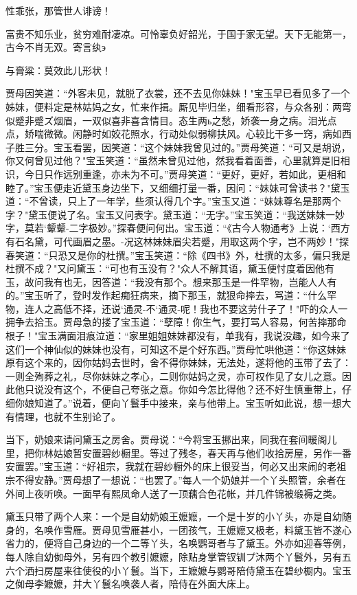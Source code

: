 性乖张，那管世人诽谤！

富贵不知乐业，贫穷难耐凄凉。可怜辜负好韶光，于国于家无望。天下无能第一，古今不肖无双。寄言纨э

与膏粱：莫效此儿形状！

贾母因笑道：“外客未见，就脱了衣裳，还不去见你妹妹！"宝玉早已看见多了一个姊妹，便料定是林姑妈之女，忙来作揖。厮见毕归坐，细看形容，与众各别：两弯似蹙非蹙ズ烟眉，一双似喜非喜含情目。态生两ь之愁，娇袭一身之病。泪光点点，娇喘微微。闲静时如姣花照水，行动处似弱柳扶风。心较比干多一窍，病如西子胜三分。宝玉看罢，因笑道：“这个妹妹我曾见过的。”贾母笑道：“可又是胡说，你又何曾见过他？"宝玉笑道：“虽然未曾见过他，然我看着面善，心里就算是旧相识，今日只作远别重逢，亦未为不可。”贾母笑道：“更好，更好，若如此，更相和睦了。”宝玉便走近黛玉身边坐下，又细细打量一番，因问：“妹妹可曾读书？"黛玉道：“不曾读，只上了一年学，些须认得几个字。”宝玉又道：“妹妹尊名是那两个字？"黛玉便说了名。宝玉又问表字。黛玉道：“无字。”宝玉笑道：“我送妹妹一妙字，莫若`颦颦-二字极妙。”探春便问何出。宝玉道：“《古今人物通考》上说：`西方有石名黛，可代画眉之墨。-况这林妹妹眉尖若蹙，用取这两个字，岂不两妙！"探春笑道：“只恐又是你的杜撰。”宝玉笑道：“除《四书》外，杜撰的太多，偏只我是杜撰不成？"又问黛玉：“可也有玉没有？"众人不解其语，黛玉便忖度着因他有玉，故问我有也无，因答道：“我没有那个。想来那玉是一件罕物，岂能人人有的。”宝玉听了，登时发作起痴狂病来，摘下那玉，就狠命摔去，骂道：“什么罕物，连人之高低不择，还说`通灵-不`通灵-呢！我也不要这劳什子了！"吓的众人一拥争去拾玉。贾母急的搂了宝玉道：“孽障！你生气，要打骂人容易，何苦摔那命根子！"宝玉满面泪痕泣道：“家里姐姐妹妹都没有，单我有，我说没趣，如今来了这们一个神仙似的妹妹也没有，可知这不是个好东西。”贾母忙哄他道：“你这妹妹原有这个来的，因你姑妈去世时，舍不得你妹妹，无法处，遂将他的玉带了去了：一则全殉葬之礼，尽你妹妹之孝心，二则你姑妈之灵，亦可权作见了女儿之意。因此他只说没有这个，不便自己夸张之意。你如今怎比得他？还不好生慎重带上，仔细你娘知道了。”说着，便向丫鬟手中接来，亲与他带上。宝玉听如此说，想一想大有情理，也就不生别论了。

当下，奶娘来请问黛玉之房舍。贾母说：“今将宝玉挪出来，同我在套间暖阁儿里，把你林姑娘暂安置碧纱橱里。等过了残冬，春天再与他们收拾房屋，另作一番安置罢。”宝玉道：“好祖宗，我就在碧纱橱外的床上很妥当，何必又出来闹的老祖宗不得安静。”贾母想了一想说：“也罢了。”每人一个奶娘并一个丫头照管，余者在外间上夜听唤。一面早有熙凤命人送了一顶藕合色花帐，并几件锦被缎褥之类。

黛玉只带了两个人来：一个是自幼奶娘王嬷嬷，一个是十岁的小丫头，亦是自幼随身的，名唤作雪雁。贾母见雪雁甚小，一团孩气，王嬷嬷又极老，料黛玉皆不遂心省力的，便将自己身边的一个二等丫头，名唤鹦哥者与了黛玉。外亦如迎春等例，每人除自幼侞母外，另有四个教引嬷嬷，除贴身掌管钗钏プ沐两个丫鬟外，另有五六个洒扫房屋来往使役的小丫鬟。当下，王嬷嬷与鹦哥陪侍黛玉在碧纱橱内。宝玉之侞母李嬷嬷，并大丫鬟名唤袭人者，陪侍在外面大床上。

